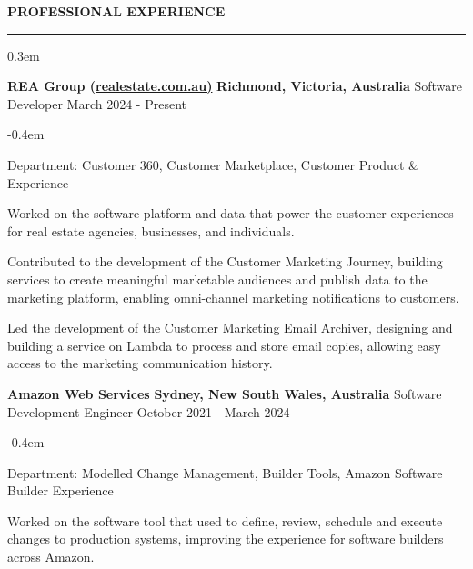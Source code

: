 \documentclass{cv}
\begin{document}
\medskip


 \textbf{PROFESSIONAL EXPERIENCE}
\sectionlineskip
\hrule
\begin{list}{}{\setlength{\leftmargin}{0em}}
\itemsep 0.3em
\item[] 
    \textbf{REA Group (\href{https://realestate.com.au/}{realestate.com.au)}} \hfill \textbf{Richmond, Victoria, Australia}%
    \vspace{0.1em} \newline 
    {Software Developer} \hfill {March 2024 - Present}%
    \begin{list}{\raisebox{0.2em}{\tiny$\bullet$}}{\leftmargin=1.0em}
    \itemsep -0.4em \vspace{-0.4em}
        \item Department: Customer 360, Customer Marketplace, Customer Product \& Experience
        \item Worked on the software platform and data that power the customer experiences for real estate agencies, businesses, and individuals.
        \item Contributed to the development of the Customer Marketing Journey, building services to create meaningful marketable audiences and publish data to the marketing platform, enabling omni-channel marketing notifications to customers.
        \item Led the development of the Customer Marketing Email Archiver, designing and building a service on Lambda to process and store email copies, allowing easy access to the marketing communication history.
    \end{list}
\item[] 
    \textbf{Amazon Web Services} \hfill \textbf{Sydney, New South Wales, Australia}%
    \vspace{0.1em} \newline 
    {Software Development Engineer} \hfill {October 2021 - March 2024}%
    \begin{list}{\raisebox{0.2em}{\tiny$\bullet$}}{\leftmargin=1.0em}
    \itemsep -0.4em \vspace{-0.4em}
        \item Department: Modelled Change Management, Builder Tools, Amazon Software Builder Experience
        \item Worked on the software tool that used to define, review, schedule and execute changes to production systems, improving the experience for software builders across Amazon.

\end{list}
\end{list}
\end{document}
